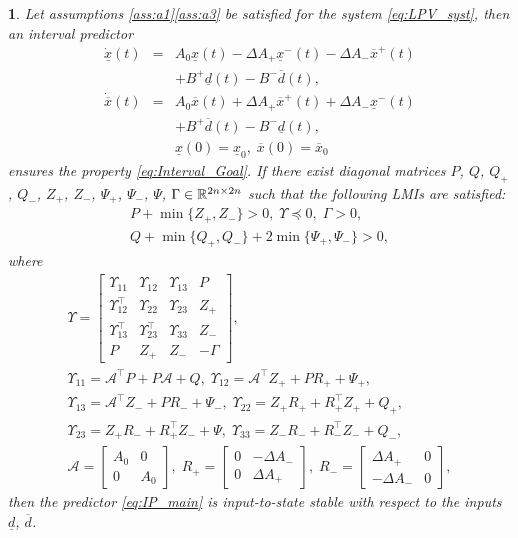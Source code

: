 \documentclass[twocolumn,english]{IEEEtran}
\theoremstyle{plain}
\theoremstyle{definition}
\theoremstyle{plain}
\theoremstyle{plain}
\newtheorem{thm}{\protect\theoremname}
\theoremstyle{remark}
\providecommand{\theoremname}{Theorem}
\begin{document}
\begin{thm}
\label{thm:main} Let assumptions \ref{ass:a1}\textendash \ref{ass:a3} be satisfied for the system \eqref{eq:LPV_syst}, then an interval predictor
\begin{eqnarray}
\dot{\underline{x}}(t) & = & A_{0}\underline{x}(t)-\Delta A_{+}\underline{x}^{-}(t)-\Delta A_{-}\overline{x}^{+}(t)\nonumber \\
 &  & +B^{+}\underline{d}(t)-B^{-}\overline{d}(t),\label{eq:IP_main}\\
\dot{\overline{x}}(t) & = & A_{0}\overline{x}(t)+\Delta A_{+}\overline{x}^{+}(t)+\Delta A_{-}\underline{x}^{-}(t)\nonumber \\
 &  & +B^{+}\overline{d}(t)-B^{-}\underline{d}(t),\nonumber \\
 &  & \underline{x}(0)=\underline{x}_{0},\;\overline{x}(0)=\overline{x}_{0}\nonumber 
\end{eqnarray}
ensures the property \eqref{eq:Interval_Goal}. If there exist diagonal matrices $P$, $Q$, $Q_{+}$, $Q_{-}$, $Z_{+}$, $Z_{-}$, $\Psi_{+}$, $\Psi_{-}$, $\Psi$, $\Gamma\in\mathbb{R}^{2n\times2n}$ such that the following LMIs are satisfied:
\begin{gather*}
P+\min\{Z_{+},Z_{-}\}>0,\;\Upsilon\preceq0,\;\Gamma>0,\\
Q+\min\{Q_{+},Q_{-}\}+2\min\{\Psi_{+},\Psi_{-}\}>0,
\end{gather*}
where{\footnotesize{}
\begin{gather*}
\Upsilon=\left[\begin{array}{cccc}
\Upsilon_{11} & \Upsilon_{12} & \Upsilon_{13} & P\\
\Upsilon_{12}^{\top} & \Upsilon_{22} & \Upsilon_{23} & Z_{+}\\
\Upsilon_{13}^{\top} & \Upsilon_{23}^{\top} & \Upsilon_{33} & Z_{-}\\
P & Z_{+} & Z_{-} & -\Gamma
\end{array}\right],\\
\Upsilon_{11}=\mathcal{A}^{\top}P+P\mathcal{A}+Q,\;\Upsilon_{12}=\mathcal{A}^{\top}Z_{+}+PR_{+}+\Psi_{+},\\
\Upsilon_{13}=\mathcal{A}^{\top}Z_{-}+PR_{-}+\Psi_{-},\;\Upsilon_{22}=Z_{+}R_{+}+R_{+}^{\top}Z_{+}+Q_{+},\\
\Upsilon_{23}=Z_{+}R_{-}+R_{+}^{\top}Z_{-}+\Psi,\;\Upsilon_{33}=Z_{-}R_{-}+R_{-}^{\top}Z_{-}+Q_{-},\\
\mathcal{A}=\left[\begin{array}{cc}
A_{0} & 0\\
0 & A_{0}
\end{array}\right],\;R_{+}=\left[\begin{array}{cc}
0 & -\Delta A_{-}\\
0 & \Delta A_{+}
\end{array}\right],\;R_{-}=\left[\begin{array}{cc}
\Delta A_{+} & 0\\
-\Delta A_{-} & 0
\end{array}\right],
\end{gather*}
}then the predictor \eqref{eq:IP_main} is input-to-state stable with respect to the inputs $\underline{d}$, $\overline{d}$.
\end{thm}
\end{document}

